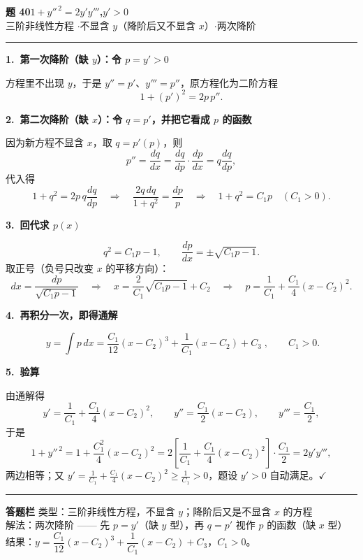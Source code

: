 \documentclass[11pt,a4paper]{ctexart}
\begin{document}
{\color{mainblue}\Large\bfseries 题 40\quad $1+y''^{\,2}=2y'y'''$,\quad $y'>0$}\\[1pt]
{\color{mainblue}\small 三阶非线性方程 \quad$\cdot$\quad 不显含 $y$（降阶后又不显含 $x$）\quad$\cdot$\quad 两次降阶}

\vspace{0.2em}
\noindent\rule{\linewidth}{0.6pt}

\textbf{1.\ 第一次降阶（缺 $y$）：令 $p=y'>0$}

方程里不出现 $y$，于是 $y''=p'$、$y'''=p''$，原方程化为二阶方程
\[
1+(p')^{2}=2p\,p'' .
\]

\textbf{2.\ 第二次降阶（缺 $x$）：令 $q=p'$，并把它看成 $p$ 的函数}

因为新方程不显含 $x$，取 $q=p'(p)$，则
\[
p''=\frac{dq}{dx}=\frac{dq}{dp}\cdot\frac{dp}{dx}=q\frac{dq}{dp},
\]
代入得
\[
1+q^{2}=2p\,q\frac{dq}{dp}
\quad\Longrightarrow\quad
\frac{2q\,dq}{1+q^{2}}=\frac{dp}{p}
\quad\Longrightarrow\quad
1+q^{2}=C_1p\quad(C_1>0).
\]

\textbf{3.\ 回代求 $p(x)$}

\[
q^{2}=C_1p-1,\qquad \frac{dp}{dx}=\pm\sqrt{C_1p-1}.
\]
取正号（负号只改变 $x$ 的平移方向）：
\[
dx=\frac{dp}{\sqrt{C_1p-1}}
\quad\Longrightarrow\quad
x=\frac{2}{C_1}\sqrt{C_1p-1}+C_2
\quad\Longrightarrow\quad
p=\frac{1}{C_1}+\frac{C_1}{4}(x-C_2)^{2}.
\]

\textbf{4.\ 再积分一次，即得通解}

\[
\boxed{\;y=\int p\,dx=\frac{C_1}{12}(x-C_2)^{3}+\frac{1}{C_1}(x-C_2)+C_3\;},\qquad C_1>0 .
\]

\textbf{5.\ 验算}

由通解得
\[
y'=\frac{1}{C_1}+\frac{C_1}{4}(x-C_2)^{2},\qquad
y''=\frac{C_1}{2}(x-C_2),\qquad
y'''=\frac{C_1}{2},
\]
于是
\[
1+y''^{\,2}=1+\frac{C_1^{2}}{4}(x-C_2)^{2}
=2\left[\frac{1}{C_1}+\frac{C_1}{4}(x-C_2)^{2}\right]\cdot\frac{C_1}{2}=2y'y''',
\]
两边相等；又 $y'=\frac{1}{C_1}+\frac{C_1}{4}(x-C_2)^{2}\ge\frac{1}{C_1}>0$，题设 $y'>0$ 自动满足。\hfill$\checkmark$

\vspace{0.2em}
\noindent\rule{\linewidth}{0.6pt}

{\small
\textbf{答题栏}\quad
类型：三阶非线性方程，不显含 $y$；降阶后又是不显含 $x$ 的方程\\
解法：两次降阶 —— 先 $p=y'$（缺 $y$ 型），再 $q=p'$ 视作 $p$ 的函数（缺 $x$ 型）\\
结果：$y=\dfrac{C_1}{12}(x-C_2)^{3}+\dfrac{1}{C_1}(x-C_2)+C_3$，$C_1>0$。}
\end{document}
